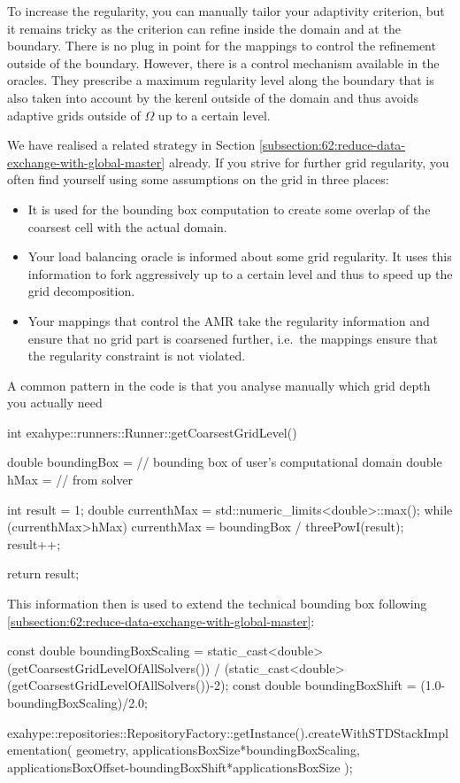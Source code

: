 \noindent
To increase the regularity, you can manually tailor your adaptivity criterion,
but it remains tricky as the criterion can refine inside the domain and at the
boundary.
There is no plug in point for the mappings to control the refinement outside of
the boundary. 
However, there is a control mechanism available in the oracles.
They prescribe a maximum regularity level along the boundary that is 
also taken into account by the kerenl outside of the domain and thus avoids
adaptive grids outside of $\Omega $ up to a certain level.

We have realised a related strategy in Section
\ref{subsection:62:reduce-data-exchange-with-global-master} already. 
If you strive for further grid regularity, you often find yourself using some
assumptions on the grid in three places:
\begin{itemize}
  \item It is used for the bounding box computation to create some overlap of
  the coarsest cell with the actual domain.
  \item Your load balancing oracle is informed about some grid regularity. It
  uses this information to fork aggressively up to a certain level and thus to
  speed up the grid decomposition.
  \item Your mappings that control the AMR take the regularity information and
  ensure that no grid part is coarsened further, i.e.~the mappings ensure that
  the regularity constraint is not violated.
\end{itemize}

\noindent
A common pattern in the code is that you analyse manually which grid depth you
actually need
\begin{code}
int exahype::runners::Runner::getCoarsestGridLevel() {
  double boundingBox =  // bounding box of user's computational domain
  double hMax        =  // from solver

  int    result      = 1;
  double currenthMax = std::numeric_limits<double>::max();
  while (currenthMax>hMax) {
    currenthMax = boundingBox / threePowI(result);
    result++;
  }

  return result;
}
\end{code}

\noindent
This information then is used to extend the technical bounding box following  
\ref{subsection:62:reduce-data-exchange-with-global-master}:
\begin{code}
  const double boundingBoxScaling = 
    static_cast<double>(getCoarsestGridLevelOfAllSolvers()) /
    (static_cast<double>(getCoarsestGridLevelOfAllSolvers())-2); 
  const double boundingBoxShift   = (1.0-boundingBoxScaling)/2.0; 
  
  exahype::repositories::RepositoryFactory::getInstance().createWithSTDStackImplementation(
      geometry,
      applicationsBoxSize*boundingBoxScaling,
      applicationsBoxOffset-boundingBoxShift*applicationsBoxSize
      );
\end{code}


